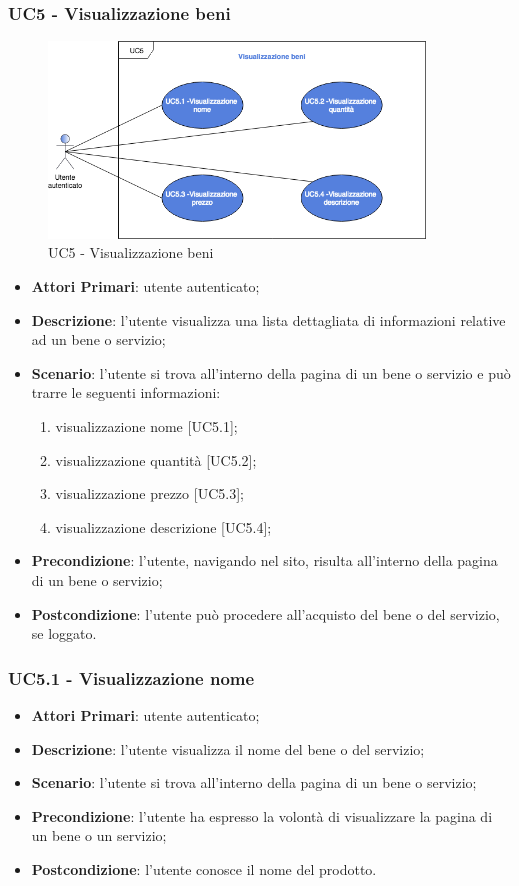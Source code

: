  \subsubsection{UC5 - Visualizzazione beni}
 \begin{figure}[h]
 	\includegraphics[width=10cm]{res/images/UC5VisualizzazioneBeni.png}
 	\centering
 	\caption{UC5 - Visualizzazione beni}
 \end{figure}
 \begin{itemize}
 	\item \textbf{Attori Primari}: utente autenticato;
 	\item \textbf{Descrizione}: l'utente visualizza una lista dettagliata di informazioni relative ad un bene o servizio;
 	\item \textbf{Scenario}: l'utente si trova all'interno della pagina di un bene o servizio e può trarre le seguenti informazioni:
 		\begin{enumerate}[label=\alph*.]
 		\item visualizzazione nome [UC5.1];
 		\item visualizzazione quantità [UC5.2];
 		\item visualizzazione prezzo [UC5.3];
 		\item visualizzazione descrizione [UC5.4];
 	\end{enumerate}
 	\item \textbf{Precondizione}: l'utente, navigando nel sito, risulta all'interno della pagina di un bene o servizio;
 	\item \textbf{Postcondizione}: l'utente può procedere all'acquisto del bene o del servizio, se loggato.
 \end{itemize}
 \subsubsection{UC5.1 - Visualizzazione nome}
\begin{itemize}
	\item \textbf{Attori Primari}: utente autenticato;
	\item \textbf{Descrizione}: l'utente visualizza il nome del bene o del servizio;
	\item \textbf{Scenario}: l'utente si trova all'interno della pagina di un bene o servizio;
	\item \textbf{Precondizione}: l'utente ha espresso la volontà di visualizzare la pagina di un bene o un servizio;
	\item \textbf{Postcondizione}: l'utente conosce il nome del prodotto.
\end{itemize}
